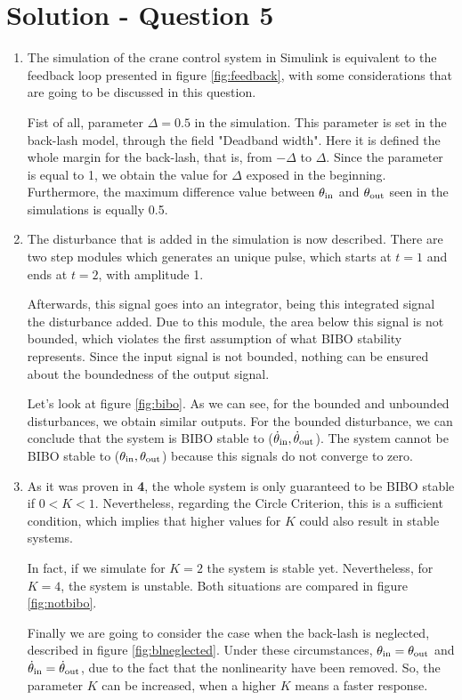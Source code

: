 \section*{Solution - Question 5}
\begin{enumerate}

\item The simulation of the crane control system in Simulink is equivalent to the feedback loop presented in figure \ref{fig:feedback}, with some considerations that are going to be discussed in this question.

Fist of all, parameter $\Delta = 0.5$ in the simulation. This parameter is set in the back-lash model, through the field "Deadband width". Here it is defined the whole margin for the back-lash, that is, from $-\Delta$ to $\Delta$. Since the parameter is equal to 1, we obtain the value for $\Delta$ exposed in the beginning. Furthermore, the maximum difference value between $\operatorname{\theta_\textrm{in}}$ and $\operatorname{\theta_\textrm{out}}$ seen in the simulations is equally 0.5.

\item The disturbance that is added in the simulation is now described. There are two step modules which generates an unique pulse, which starts at $t=1$ and ends at $t=2$, with amplitude 1.

Afterwards, this signal goes into an integrator, being this integrated signal the disturbance added. Due to this module, the area below this signal is not bounded, which violates the first assumption of what BIBO stability represents. Since the input signal is not bounded, nothing can be ensured about the boundedness of the output signal.

Let's look at figure \ref{fig:bibo}. As we can see, for the bounded and unbounded disturbances, we obtain similar outputs. For the bounded disturbance, we can conclude that the system is BIBO stable to ($\operatorname{\dot{\theta}_\textrm{in}}, \operatorname{\dot{\theta}_\textrm{out}}$). The system cannot be BIBO stable to ($\operatorname{\theta_\textrm{in}}, \operatorname{\theta_\textrm{out}}$) because this signals do not converge to zero.

\item As it was proven in \textbf{4}, the whole system is only guaranteed to be BIBO stable if $0<K<1$. Nevertheless, regarding the Circle Criterion, this is a sufficient condition, which implies that higher values for $K$ could also result in stable systems. 

In fact, if we simulate for $K=2$ the system is stable yet. Nevertheless, for $K=4$, the system is unstable. Both situations are compared in figure \ref{fig:notbibo}. 

Finally we are going to consider the case when the back-lash is neglected, described in figure \ref{fig:blneglected}. Under these circumstances, $\operatorname{\theta_\textrm{in}} = \operatorname{\theta_\textrm{out}}$ and $\operatorname{\dot{\theta}_\textrm{in}} = \operatorname{\dot{\theta}_\textrm{out}}$, due to the fact that  the nonlinearity have been removed. So,  the parameter $K$ can be increased, when a higher $K$ means a faster response.

\end{enumerate}